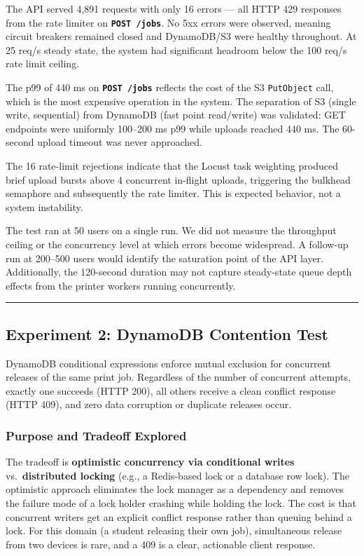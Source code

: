 \documentclass[11pt,letterpaper]{article}
\newcommand{\code}[1]{\texttt{\small #1}}
\newcommand{\http}[1]{\textbf{\texttt{#1}}}
\begin{document}
\begin{resultbox}
The API served 4,891 requests with only 16 errors --- all HTTP 429 responses from the rate limiter on \http{POST /jobs}. No 5xx errors were observed, meaning circuit breakers remained closed and DynamoDB/S3 were healthy throughout. At 25 req/s steady state, the system had significant headroom below the 100 req/s rate limit ceiling.

The p99 of 440 ms on \http{POST /jobs} reflects the cost of the S3 \code{PutObject} call, which is the most expensive operation in the system. The separation of S3 (single write, sequential) from DynamoDB (fast point read/write) was validated: GET endpoints were uniformly 100--200 ms p99 while uploads reached 440 ms. The 60-second upload timeout was never approached.

The 16 rate-limit rejections indicate that the Locust task weighting produced brief upload bursts above 4 concurrent in-flight uploads, triggering the bulkhead semaphore and subsequently the rate limiter. This is expected behavior, not a system instability.
\end{resultbox}

\begin{limitbox}
The test ran at 50 users on a single run. We did not measure the throughput ceiling or the concurrency level at which errors become widespread. A follow-up run at 200--500 users would identify the saturation point of the API layer. Additionally, the 120-second duration may not capture steady-state queue depth effects from the printer workers running concurrently.
\end{limitbox}

\medskip\hrule\medskip

\subsection{Experiment 2: DynamoDB Contention Test}
\label{sec:exp2}

\begin{claimbox}
DynamoDB conditional expressions enforce mutual exclusion for concurrent releases of the same print job. Regardless of the number of concurrent attempts, exactly one succeeds (HTTP 200), all others receive a clean conflict response (HTTP 409), and zero data corruption or duplicate releases occur.
\end{claimbox}

\subsubsection{Purpose and Tradeoff Explored}
The tradeoff is \textbf{optimistic concurrency via conditional writes} vs.\ \textbf{distributed locking} (e.g., a Redis-based lock or a database row lock). The optimistic approach eliminates the lock manager as a dependency and removes the failure mode of a lock holder crashing while holding the lock. The cost is that concurrent writers get an explicit conflict response rather than queuing behind a lock. For this domain (a student releasing their own job), simultaneous release from two devices is rare, and a 409 is a clear, actionable client response.
\end{document}
